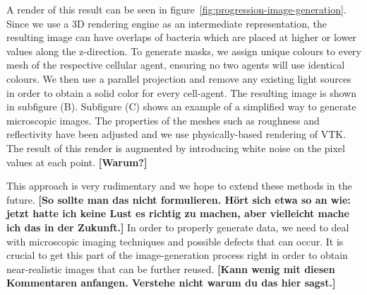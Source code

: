 \documentclass{article}
\begin{document}
A render of this result can be seen in figure~\ref{fig:progression-image-generation}.
Since we use a 3D rendering engine as an intermediate representation, the resulting image can have
overlaps of bacteria which are placed at higher or lower values along the z-direction.
To generate masks, we assign unique colours to every mesh of the respective cellular agent, ensuring
no two agents will use identical colours.
We then use a parallel projection and remove any existing light sources in order to obtain a solid
color for every cell-agent.
The resulting image is shown in subfigure (B).
Subfigure (C) shows an example of a simplified way to generate microscopic images.
The properties of the meshes such as roughness and reflectivity have been adjusted and we use
physically-based rendering of VTK. The result of this render is augmented by introducing white noise
on the pixel values at each point.
\textbf{[Warum?]}

This approach is very rudimentary and we hope to extend these methods in the future.
\textbf{[So sollte man das nicht formulieren. Hört sich etwa so an wie: jetzt hatte ich keine Lust es richtig zu machen, aber vielleicht mache ich das in der Zukunft.]}
In order to properly generate data, we need to deal with microscopic imaging techniques and possible
defects that can occur. It is crucial to get this part of the image-generation process right in
order to obtain near-realistic images that can be further reused.
\textbf{[Kann wenig mit diesen Kommentaren anfangen. Verstehe nicht warum du das hier sagst.]}
\end{document}
